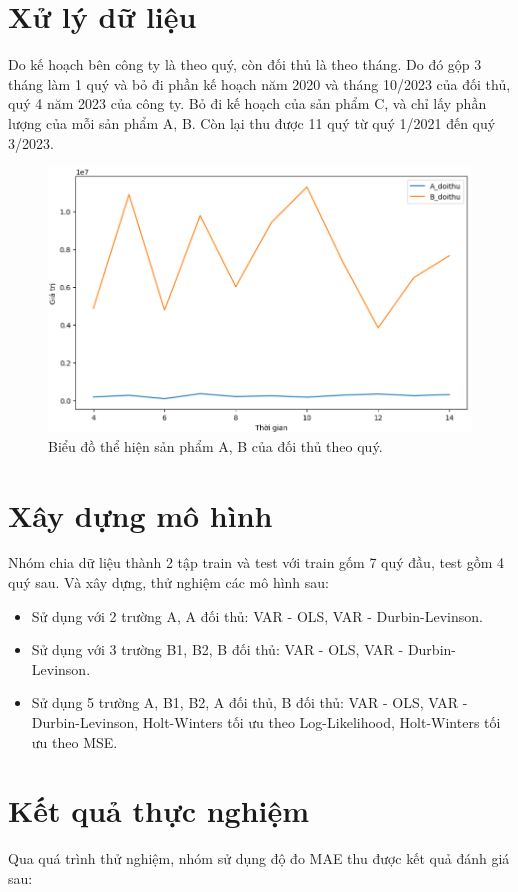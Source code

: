 \section{Xử lý dữ liệu}
Do kế hoạch bên công ty là theo quý, còn đối thủ là theo tháng. Do đó gộp 3 tháng làm 1 quý và bỏ đi phần kế hoạch năm 2020 và tháng 10/2023 của đối thủ, quý 4 năm 2023 của công ty. Bỏ đi kế hoạch của sản phẩm C, và chỉ lấy phần lượng của mỗi sản phẩm A, B. Còn lại thu được 11 quý từ quý 1/2021 đến quý 3/2023. 

\begin{figure}[H]
    \centering
    \includegraphics[width = \textwidth]{figure/ABLuong.PNG}
    \caption{Biểu đồ thể hiện sản phẩm A, B của đối thủ theo quý.}
    \label{fig:ABLuong}
\end{figure}

\section{Xây dựng mô hình}
Nhóm chia dữ liệu thành 2 tập train và test với train gốm 7 quý đầu, test gồm 4 quý sau. Và xây dựng, thử nghiệm các mô hình sau:
\begin{itemize}
        \item Sử dụng với 2 trường A, A đối thủ: VAR - OLS, VAR - Durbin-Levinson.
    \item Sử dụng với 3 trường B1, B2, B đối thủ: VAR - OLS, VAR - Durbin-Levinson.
    \item Sử dụng 5 trường A, B1, B2, A đối thủ, B đối thủ: VAR - OLS, VAR - Durbin-Levinson, Holt-Winters tối ưu theo Log-Likelihood, Holt-Winters tối ưu theo MSE.
\end{itemize}

\section{Kết quả thực nghiệm}
Qua quá trình thử nghiệm, nhóm sử dụng độ đo MAE thu được kết quả đánh giá sau:

